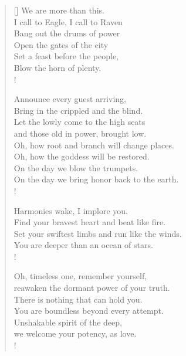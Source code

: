 \begin{verse}[\versewidth]
We are more than this.\\
I call to Eagle, I call to Raven\\
Bang out the drums of power\\
Open the gates of the city\\
Set a feast before the people,\\
Blow the horn of plenty.\\!

Announce every guest arriving,\\
Bring in the crippled and the blind.\\
Let the lowly come to the high seats\\
and those old in power, brought low.\\
Oh, how root and branch will change places.\\
Oh, how the goddess will be restored.\\
On the day we blow the trumpets.\\
On the day we bring honor back to the earth.\\!

Harmonies wake, I implore you.\\
Find your bravest heart and beat like fire.\\
Set your swiftest limbs and run like the winds.\\
You are deeper than an ocean of stars.\\!

Oh, timeless one, remember yourself,\\
reawaken the dormant power of your truth.\\
There is nothing that can hold you.\\
You are boundless beyond every attempt.\\
Unshakable spirit of the deep,\\
we welcome your potency, as love.\\!
\end{verse}

